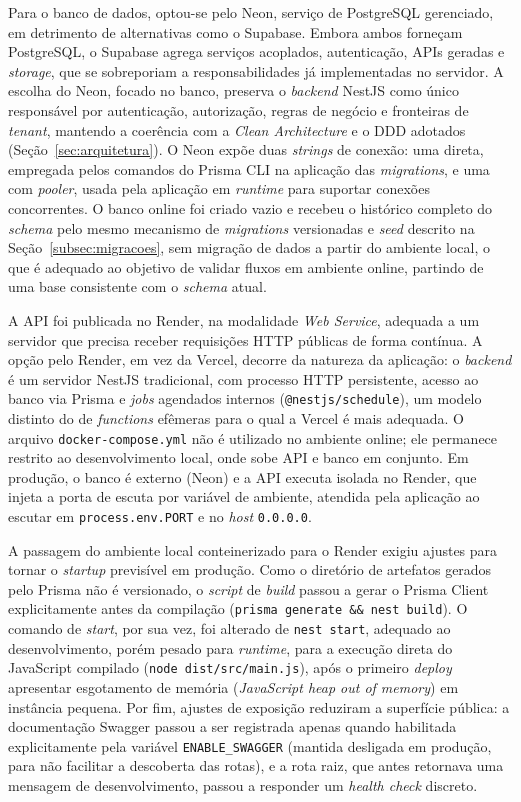 Para o banco de dados, optou-se pelo Neon, serviço de PostgreSQL gerenciado, em detrimento de alternativas como o Supabase. Embora ambos forneçam PostgreSQL, o Supabase agrega serviços acoplados, autenticação, APIs geradas e \textit{storage}, que se sobreporiam a responsabilidades já implementadas no servidor. A escolha do Neon, focado no banco, preserva o \textit{backend} NestJS como único responsável por autenticação, autorização, regras de negócio e fronteiras de \textit{tenant}, mantendo a coerência com a \textit{Clean Architecture} e o DDD adotados (Seção~\ref{sec:arquitetura}). O Neon expõe duas \textit{strings} de conexão: uma direta, empregada pelos comandos do Prisma CLI na aplicação das \textit{migrations}, e uma com \textit{pooler}, usada pela aplicação em \textit{runtime} para suportar conexões concorrentes. O banco online foi criado vazio e recebeu o histórico completo do \textit{schema} pelo mesmo mecanismo de \textit{migrations} versionadas e \textit{seed} descrito na Seção~\ref{subsec:migracoes}, sem migração de dados a partir do ambiente local, o que é adequado ao objetivo de validar fluxos em ambiente online, partindo de uma base consistente com o \textit{schema} atual.

A API foi publicada no Render, na modalidade \textit{Web Service}, adequada a um servidor que precisa receber requisições HTTP públicas de forma contínua. A opção pelo Render, em vez da Vercel, decorre da natureza da aplicação: o \textit{backend} é um servidor NestJS tradicional, com processo HTTP persistente, acesso ao banco via Prisma e \textit{jobs} agendados internos (\texttt{@nestjs/schedule}), um modelo distinto do de \textit{functions} efêmeras para o qual a Vercel é mais adequada. O arquivo \texttt{docker-compose.yml} não é utilizado no ambiente online; ele permanece restrito ao desenvolvimento local, onde sobe API e banco em conjunto. Em produção, o banco é externo (Neon) e a API executa isolada no Render, que injeta a porta de escuta por variável de ambiente, atendida pela aplicação ao escutar em \texttt{process.env.PORT} e no \textit{host} \texttt{0.0.0.0}.

A passagem do ambiente local conteinerizado para o Render exigiu ajustes para tornar o \textit{startup} previsível em produção. Como o diretório de artefatos gerados pelo Prisma não é versionado, o \textit{script} de \textit{build} passou a gerar o Prisma Client explicitamente antes da compilação (\texttt{prisma generate \&\& nest build}). O comando de \textit{start}, por sua vez, foi alterado de \texttt{nest start}, adequado ao desenvolvimento, porém pesado para \textit{runtime}, para a execução direta do JavaScript compilado (\texttt{node dist/src/main.js}), após o primeiro \textit{deploy} apresentar esgotamento de memória (\textit{JavaScript heap out of memory}) em instância pequena. Por fim, ajustes de exposição reduziram a superfície pública: a documentação Swagger passou a ser registrada apenas quando habilitada explicitamente pela variável \texttt{ENABLE\_SWAGGER} (mantida desligada em produção, para não facilitar a descoberta das rotas), e a rota raiz, que antes retornava uma mensagem de desenvolvimento, passou a responder um \textit{health check} discreto.

